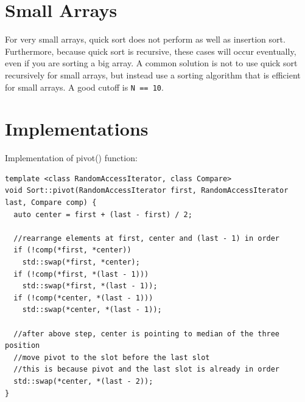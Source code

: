 \documentclass[11pt]{book}
\begin{document}
\section{Small Arrays}
\label{sec:org742fb19}
For very small arrays, quick sort does not perform as well as insertion sort. Furthermore, because quick sort is recursive, these cases will occur eventually, even if you are sorting a big array. A common solution is not to use quick sort recursively for small arrays, but instead use a sorting algorithm that is efficient for small arrays. A good cutoff is \texttt{N == 10}.
\section{Implementations}
\label{sec:orgb6ff4e8}
Implementation of pivot() function:
\begin{verbatim}
template <class RandomAccessIterator, class Compare>
void Sort::pivot(RandomAccessIterator first, RandomAccessIterator last, Compare comp) {
  auto center = first + (last - first) / 2;

  //rearrange elements at first, center and (last - 1) in order
  if (!comp(*first, *center))
    std::swap(*first, *center);
  if (!comp(*first, *(last - 1)))
    std::swap(*first, *(last - 1));
  if (!comp(*center, *(last - 1)))
    std::swap(*center, *(last - 1));

  //after above step, center is pointing to median of the three position
  //move pivot to the slot before the last slot
  //this is because pivot and the last slot is already in order
  std::swap(*center, *(last - 2));  
}
\end{verbatim}
\end{document}
